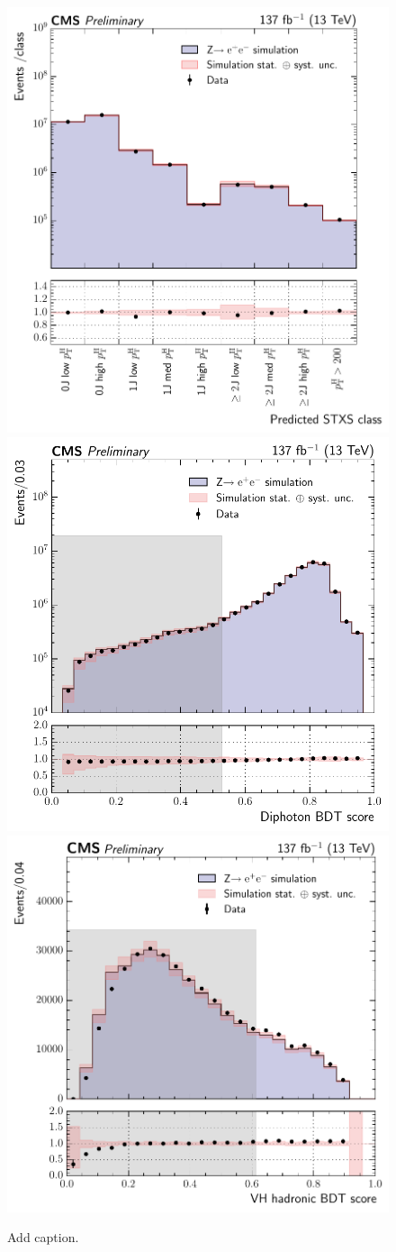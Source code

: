 \begin{figure}[hptb]
  \centering
  \includegraphics[width=.55\textwidth]{Figures/hgg_overview/ggH_BDT_validation.pdf}
  \includegraphics[width=.47\textwidth]{Figures/hgg_overview/DiphotonBDT_validation.pdf}
  \includegraphics[width=.49\textwidth]{Figures/hgg_overview/VHHadronicBDT_validation.pdf}
  \caption[Validation of the event categorisation classifiers]
  {
    Add caption.
  }
  \label{fig:categorisation_validation}
\end{figure}

